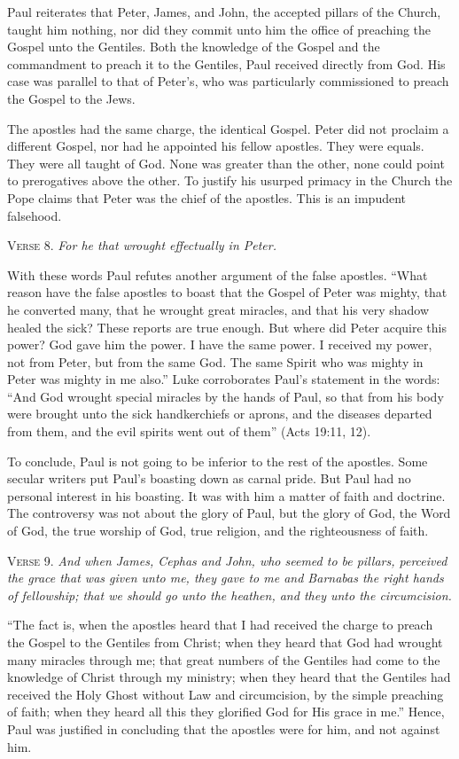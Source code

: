 Paul reiterates that Peter, James, and John, the accepted pillars of the Church, taught him nothing, nor did they commit unto him the office of preaching the Gospel unto the Gentiles. Both the knowledge of the Gospel and the commandment to preach it to the Gentiles, Paul received directly from God. His case was parallel to that of Peter’s, who was particularly commissioned to preach the Gospel to the Jews.

The apostles had the same charge, the identical Gospel. Peter did not proclaim a different Gospel, nor had he appointed his fellow apostles. They were equals. They were all taught of God. None was greater than the other, none could point to prerogatives above the other. To justify his usurped primacy in the Church the Pope claims that Peter was the chief of the apostles. This is an impudent falsehood.

\textsc{Verse} 8. \emph{For he that wrought effectually in Peter.}

With these words Paul refutes another argument of the false apostles. “What reason have the false apostles to boast that the Gospel of Peter was mighty, that he converted many, that he wrought great miracles, and that his very shadow healed the sick? These reports are true enough. But where did Peter acquire this power? God gave him the power. I have the same power. I received my power, not from Peter, but from the same God. The same Spirit who was mighty in Peter was mighty in me also.” Luke corroborates Paul’s statement in the words: “And God wrought special miracles by the hands of Paul, so that from his body were brought unto the sick handkerchiefs or aprons, and the diseases departed from them, and the evil spirits went out of them” (Acts 19:11, 12).

To conclude, Paul is not going to be inferior to the rest of the apostles. Some secular writers put Paul’s boasting down as carnal pride. But Paul had no personal interest in his boasting. It was with him a matter of faith and doctrine. The controversy was not about the glory of Paul, but the glory of God, the Word of God, the true worship of God, true religion, and the righteousness of faith.

\textsc{Verse} 9. \emph{And when James, Cephas and John, who seemed to be pillars, perceived the grace that was given unto me, they gave to me and Barnabas the right hands of fellowship; that we should go unto the heathen, and they unto the circumcision.}

“The fact is, when the apostles heard that I had received the charge to preach the Gospel to the Gentiles from Christ; when they heard that God had wrought many miracles through me; that great numbers of the Gentiles had come to the knowledge of Christ through my ministry; when they heard that the Gentiles had received the Holy Ghost without Law and circumcision, by the simple preaching of faith; when they heard all this they glorified God for His grace in me.” Hence, Paul was justified in concluding that the apostles were for him, and not against him.

